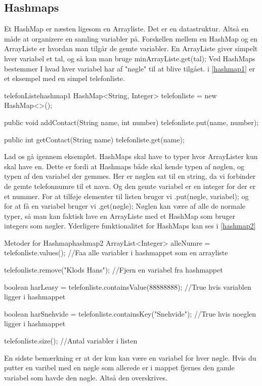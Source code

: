 \subsection{Hashmaps}
Et HashMap er næsten ligesom en Arrayliste. Det er en datastruktur. Altså en måde at organizere en samling variabler på. Forskellen mellem en HashMap og en ArrayListe er hvordan man tilgår de gemte variabler. En ArrayListe giver simpelt hver variabel et tal, og så kan man bruge minArrayListe.get(tal); Ved HashMaps bestemmer I hvad hver variabel har af "nøgle" til at blive tilgået. i \autoref{hashmap1} er et eksempel med en simpel telefonliste.
\begin{JavaCode}{telefonListe}{hashmap1}
	HashMap<String, Integer> telefonliste = new HashMap<>();
	
	public void addContact(String name, int number){
		telefonliste.put(name, number);
	}
	
	public int getContact(String name){
		telefonliste.get(name);	
	}
\end{JavaCode}
Lad os gå igennem eksemplet. HashMaps skal have to typer hvor ArrayLister kun skal have en. Dette er fordi at Hashmaps både skal kende typen af nøglen, og typen af den variabel der gemmes. Her er nøglen sat til en string, da vi forbinder de gemte telefonnumre til et navn. Og den gemte variabel er en integer for der er et nummer.  For at tilføje elementer til listen bruger vi .put(nøgle, variabel); og for at få en variabel bruger vi .get(nøgle); Nøglen kan være af alle de normale typer, så man kan faktisk lave en ArrayListe med et HashMap som bruger integers som nøgler. Yderligere funktionalitet for HashMaps kan ses i \autoref{hashmap2}
\begin{JavaCode}{Metoder for Hashmap}{hashmap2}
	ArrayList<Integer> alleNumre = telefonliste.values();
	//Faa alle variabler i hashmappet som en arrayliste
	
	telefonliste.remove("Klods Hans");
	//Fjern en variabel fra hashmappet
	
	boolean harLeasy = telefonliste.containsValue(88888888);
	//True hvis variablen ligger i hashmappet
	
	boolean harSnehvide = telefonliste.containsKey("Snehvide");
	//True hvis noeglen ligger i hashmappet
	
	telefonliste.size();
	//Antal variabler i listen
\end{JavaCode}
En sidste bemærkning er at der kun kan være en variabel for hver nøgle. Hvis du putter en varibel med en nøgle som allerede er i mappet fjernes den gamle variabel som havde den nøgle. Altså den overskrives.

